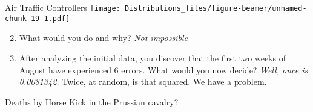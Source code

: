 \documentclass[ignorenonframetext,]{beamer}
\begin{document}
\begin{frame}[fragile]{Air Traffic Controllers}
\texttt{[image: Distributions\_files/figure-beamer/unnamed-chunk-19-1.pdf]}

\begin{enumerate}[<+->]
\setcounter{enumi}{1}
\item
  What would you do and why? \emph{Not impossible}
\item
  After analyzing the initial data, you discover that the first two
  weeks of August have experienced 6 errors. What would you now decide?
  \emph{Well, once is 0.0081342.} Twice, at random, is that squared. We
  have a problem.
\end{enumerate}

\end{frame}

\begin{frame}{Deaths by Horse Kick in the Prussian cavalry?}
\protect\hypertarget{deaths-by-horse-kick-in-the-prussian-cavalry}{}

\end{frame}
\end{document}
